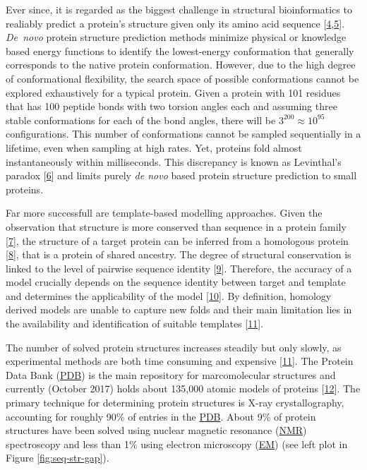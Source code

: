\documentclass[11pt,a4paper,twoside]{book}
\theoremstyle{definition}
\theoremstyle{definition}
\theoremstyle{remark}
\begin{document}
Ever since, it is regarded as the biggest challenge in structural
bioinformatics to realiably predict a protein's structure given only its
amino acid sequence
{[}\protect\hyperlink{ref-Samish2015}{4},\protect\hyperlink{ref-Schwede2013}{5}{]}.
\emph{De~novo} protein structure prediction methods minimize physical or
knowledge based energy functions to identify the lowest-energy
conformation that generally corresponds to the native protein
conformation. However, due to the high degree of conformational
flexibility, the search space of possible conformations cannot be
explored exhaustively for a typical protein. Given a protein with 101
residues that has 100 peptide bonds with two torsion angles each and
assuming three stable conformations for each of the bond angles, there
will be \(3^{200} \approx 10^{95}\) configurations. This number of
conformations cannot be sampled sequentially in a lifetime, even when
sampling at high rates. Yet, proteins fold almost instantaneously within
milliseconds. This discrepancy is known as Levinthal's paradox
{[}\protect\hyperlink{ref-Levinthal1969}{6}{]} and limits purely
\emph{de novo} based protein structure prediction to small proteins.

Far more successfull are template-based modelling approaches. Given the
observation that structure is more conserved than sequence in a protein
family {[}\protect\hyperlink{ref-Lesk1980}{7}{]}, the structure of a
target protein can be inferred from a homologous protein
{[}\protect\hyperlink{ref-Sander1991}{8}{]}, that is a protein of shared
ancestry. The degree of structural conservation is linked to the level
of pairwise sequence identity
{[}\protect\hyperlink{ref-Chothia1986}{9}{]}. Therefore, the accuracy of
a model crucially depends on the sequence identity between target and
template and determines the applicability of the model
{[}\protect\hyperlink{ref-Marti-Renom2000}{10}{]}. By definition,
homology derived models are unable to capture new folds and their main
limitation lies in the availability and identification of suitable
templates {[}\protect\hyperlink{ref-Dorn2014}{11}{]}.

The number of solved protein structures increases steadily but only
slowly, as experimental methods are both time consuming and expensive
{[}\protect\hyperlink{ref-Dorn2014}{11}{]}. The Protein Data Bank
(\protect\hyperlink{abbrev}{PDB}) is the main repository for
marcomolecular structures and currently (October 2017) holds about
135,000 atomic models of proteins
{[}\protect\hyperlink{ref-Berman2000}{12}{]}. The primary technique for
determining protein structures is X-ray crystallography, accounting for
roughly 90\% of entries in the \protect\hyperlink{abbrev}{PDB}. About
9\% of protein structures have been solved using nuclear magnetic
resonance (\protect\hyperlink{abbrev}{NMR}) spectroscopy and less than
1\% using electron microscopy (\protect\hyperlink{abbrev}{EM}) (see left
plot in Figure \ref{fig:seq-str-gap}).
\end{document}
